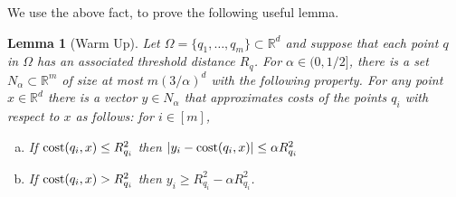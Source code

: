 \documentclass[11pt]{article}
\newtheorem{lemma}{Lemma}[section]
\theoremstyle{restate}
\theoremstyle{definition}
\newcommand{\R}{\ensuremath{\mathbb{R}}}
\newcommand{\cost}{\textnormal{cost}}
\begin{document}
We use the above fact, to prove the following useful lemma. 
\begin{lemma}[Warm Up]\label{lem: warm-up}
    Let $\Omega = \{q_1, \ldots, q_m\} \subset \R^d$ and suppose that each point $q$ in $\Omega$ has an associated threshold distance $R_q$. For $\alpha \in (0,1/2]$, there is a set $N_\alpha \subset \R^m$ of size at most $m (3/\alpha)^d$ with the following property. For any point $x \in \R^d$ there is a vector $y \in N_\alpha$ that approximates costs of the points $q_i$ with respect to $x$ as follows: for $i \in [m]$,  
	\begin{enumerate}[(a)]
		\item \label{item: net-cond-1} If $\cost(q_i, x) \leq R_{q_i}^2$ then 
		$| y_{i} - \cost(q_i, x)| \leq \alpha R_{q_i}^2$
            \item \label{item: net-cond-2}If $\cost(q_i, x) > R_{q_i}^2$ then $y_i \geq R_{q_i}^2 - \alpha R_{q_i}^2$.
	\end{enumerate}
\end{lemma}
\end{document}
